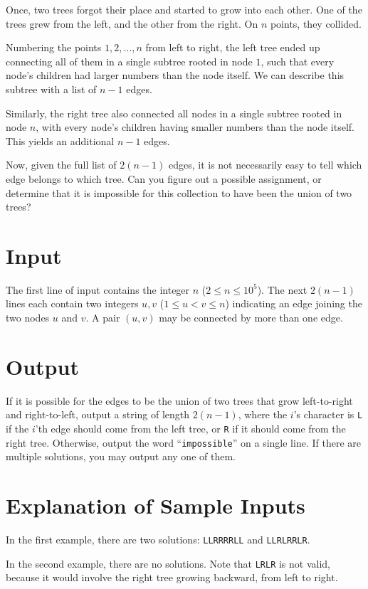 
\noindent
Once, two trees forgot their place and started to grow into each other.
One of the trees grew from the left, and the other from the right.
On $n$ points, they collided.

Numbering the points $1, 2, \dots, n$ from left to right,
the left tree ended up connecting all of them in a single subtree
rooted in node $1$, such that
every node's children had larger numbers than the node itself.
We can describe this subtree with a list of $n-1$ edges.

Similarly, the right tree also connected all nodes in a single subtree
rooted in node $n$, with
every node's children having smaller numbers than the node itself.
This yields an additional $n-1$ edges.

Now, given the full list of $2(n-1)$ edges, it is not necessarily easy to
tell which edge belongs to which tree.
Can you figure out a possible assignment, or determine that it is impossible
for this collection to have been the union of two trees?

\section*{Input}
The first line of input contains the integer $n$ ($2 \le n \le 10^5$).
The next $2(n-1)$ lines each contain two integers $u, v$ ($1 \le u < v \le n$) indicating an edge joining the two nodes $u$ and $v$.
A pair $(u, v)$ may be connected by more than one edge.

\section*{Output}
If it is possible for the edges to be the union of two trees that
grow left-to-right and right-to-left, output a string of length $2(n-1)$,
where the $i$'s character
is \texttt{L} if the $i$'th edge should come from the left tree,
or \texttt{R} if it should come from the right tree.
Otherwise, output the word ``\texttt{impossible}'' on a single line.
If there are multiple solutions, you may output any one of them.

\section*{Explanation of Sample Inputs}
In the first example, there are two solutions: \texttt{LLRRRRLL} and \texttt{LLRLRRLR}.

In the second example, there are no solutions.
Note that \texttt{LRLR} is not valid, because it would involve the right tree
growing backward, from left to right.
